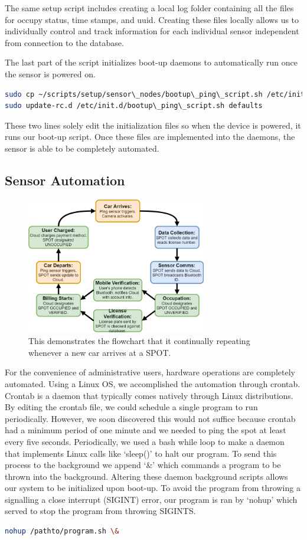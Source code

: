 The same setup script includes creating a local log folder containing all the files for occupy status, time stamps, and uuid.
Creating these files locally allows us to individually control and track information for each individual sensor independent from connection to the database.

The last part of the script initializes boot-up daemons to automatically run once the sensor is powered on.
\begin{lstlisting}[language=bash]
sudo cp ~/scripts/setup/sensor\_nodes/bootup\_ping\_script.sh /etc/init.d/
sudo update-rc.d /etc/init.d/bootup\_ping\_script.sh defaults
\end{lstlisting}
These two lines solely edit the initialization files so when the device is powered, it runs our boot-up script.
Once these files are implemented into the daemons, the sensor is able to be completely automated.
\subsection{Sensor Automation}
\begin{figure}[ht!]
\centering
\includegraphics[width=0.7\textwidth]{pictures/EventFlowchart.png}
\caption{This demonstrates the flowchart that it continually repeating whenever a new car arrives at a SPOT.}
\end{figure}
For the convenience of administrative users, hardware operations are completely automated.
Using a Linux OS, we accomplished the automation through crontab. 
Crontab is a daemon that typically comes natively through Linux distributions. 
By editing the crontab file, we could schedule a single program to run periodically. 
However, we soon discovered this would not suffice because crontab had a minimum period of one minute and we needed to ping the spot at least every five seconds.
Periodically, we used a bash while loop to make a daemon that implements Linux calls like ‘sleep()’ to halt our program.
To send this process to the background we append ‘\&’ which commands a program to be thrown into the background. 
Altering these daemon background scripts allows our system to be initialized upon boot-up.
To avoid the program from throwing a signalling a close interrupt (SIGINT) error, our program is ran by ‘nohup’ which served to stop the program from throwing SIGINTS.
\begin{lstlisting}[language=bash]
nohup /pathto/program.sh \&
\end{lstlisting}


